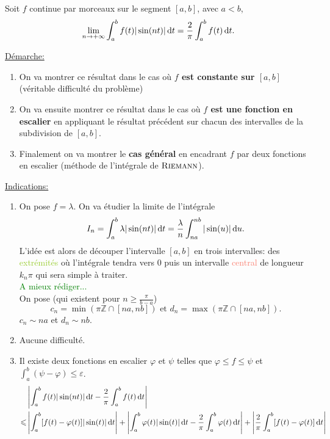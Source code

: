 \begin{tcolorbox}
    Soit $f$ continue par morceaux sur le segment $[a,b]$, avec $a < b$,
    $$\lim_{n \to +\infty} \int_{a}^{b} f(t) | \sin (nt) | \, \mathrm{d} t = \frac{2}{\pi} \int_{a}^{b} f(t) \, \mathrm{d} t.$$
\end{tcolorbox}
    
\underline{Démarche:}
\begin{enumerate}[noitemsep]
    \item On va montrer ce résultat dans le cas où \textbf{$f$ est constante sur $[a, b]$} (véritable difficulté du problème) 
    \item On va ensuite montrer ce résultat dans le cas où \textbf{$f$ est une fonction en escalier} en appliquant le résultat précédent sur chacun des intervalles de la subdivision de $[a, b]$.
    \item Finalement on va montrer le \textbf{cas général} en encadrant $f$ par deux fonctions en escalier (méthode de l'intégrale de $\textsc{Riemann}$).
\end{enumerate}
\underline{Indications:}
\begin{enumerate}[noitemsep]
    \item On pose $f = \lambda$. On va étudier la limite de l'intégrale
    $$I_n = \int_{a}^{b} \lambda | \sin(nt) | \, \mathrm{d} t = \frac{\lambda}{n} \int_{na}^{nb} | \sin(u) | \, \mathrm{d} u.$$
    L'idée est alors de découper l'intervalle $[a, b]$ en trois intervalles: des \textcolor{YellowGreen}{extrémités} où l'intégrale tendra vers $0$ puis un intervalle \textcolor{Salmon}{central} de longueur $k_n \pi$ qui sera simple à traiter. \\
    \textcolor{green}{A mieux rédiger...} \\
    On pose (qui existent pour $n \geqslant \frac{\pi}{b-a}$)
    $$c_n = \min( \pi \mathbb{Z} \cap [na, nb]) \text{ et } d_n = \max( \pi \mathbb{Z} \cap [na, nb]).$$
    $c_n \sim na$ et $d_n \sim nb$. 
    \item Aucune difficulté.
    \item Il existe deux fonctions en escalier $\varphi$ et $\psi$ telles que $\varphi \leqslant f \leqslant \psi$ et $\int_{a}^{b} (\psi - \varphi) \leqslant \varepsilon$.
    \begin{align*}
        & \left | \int_{a}^{b} f(t) | \sin (nt) | \, \mathrm{d} t - \frac{2}{\pi} \int_{a}^{b} f(t) \, \mathrm{d} t \right| \\
        \leqslant & \left | \int_{a}^{b} [f(t) - \varphi(t) ] | \sin(t) | \, \mathrm{d} t \right| + \left | \int_{a}^{b} \varphi(t) |\sin(t)| \, \mathrm{d} t - \frac{2}{\pi} \int_{a}^{b} \varphi(t) \, \mathrm{d} t \right| + \left| \frac{2}{\pi} \int_{a}^{b} [f(t) - \varphi(t)] \, \mathrm{d} t \right|
    \end{align*}
\end{enumerate}